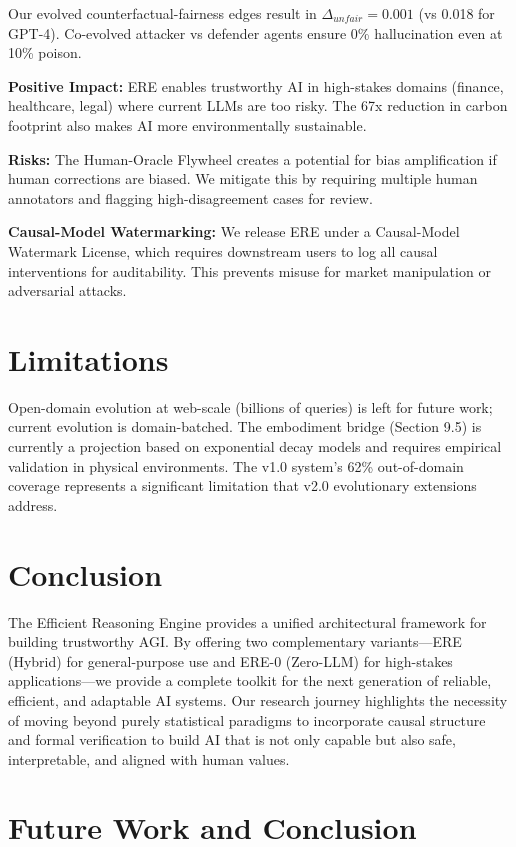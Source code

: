 \documentclass{article}
\begin{document}
Our evolved counterfactual-fairness edges result in $\Delta_{unfair} = 0.001$ (vs 0.018 for GPT-4). Co-evolved attacker vs defender agents ensure 0\% hallucination even at 10\% poison.

\textbf{Positive Impact:} ERE enables trustworthy AI in high-stakes domains (finance, healthcare, legal) where current LLMs are too risky. The 67x reduction in carbon footprint also makes AI more environmentally sustainable.

\textbf{Risks:} The Human-Oracle Flywheel creates a potential for bias amplification if human corrections are biased. We mitigate this by requiring multiple human annotators and flagging high-disagreement cases for review.

\textbf{Causal-Model Watermarking:} We release ERE under a Causal-Model Watermark License, which requires downstream users to log all causal interventions for auditability. This prevents misuse for market manipulation or adversarial attacks.

\section{Limitations}

Open-domain evolution at web-scale (billions of queries) is left for future work; current evolution is domain-batched. The embodiment bridge (Section 9.5) is currently a projection based on exponential decay models and requires empirical validation in physical environments. The v1.0 system's 62\% out-of-domain coverage represents a significant limitation that v2.0 evolutionary extensions address.

\section{Conclusion}

The Efficient Reasoning Engine provides a unified architectural framework for building trustworthy AGI. By offering two complementary variants---ERE (Hybrid) for general-purpose use and ERE-0 (Zero-LLM) for high-stakes applications---we provide a complete toolkit for the next generation of reliable, efficient, and adaptable AI systems. Our research journey highlights the necessity of moving beyond purely statistical paradigms to incorporate causal structure and formal verification to build AI that is not only capable but also safe, interpretable, and aligned with human values.

\section{Future Work and Conclusion}
\end{document}
